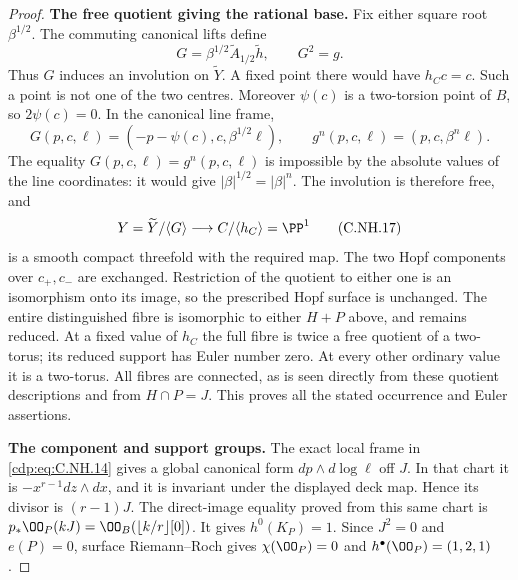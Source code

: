 \begin{proof}
\par\medskip\noindent\textbf{The free quotient giving the rational base.}
Fix either square root $\beta^{1/2}$. The commuting
canonical lifts define
\[
           G=\beta^{1/2}\widetilde A_{1/2}\widetilde h,
                    \qquad G^2=g.
                                                        \tag{C.NH.15}\label{cdp:eq:C.NH.15}
\]
Thus $G$ induces an involution on $\widetilde Y$. A fixed
point there would have $h_Cc=c$. Such a point is not one
of the two centres. Moreover $\psi(c)$ is a two-torsion
point of $B$, so $2\psi(c)=0$. In the canonical line frame,
\[
 G(p,c,\ell)=(-p-\psi(c),c,\beta^{1/2}\ell),
 \qquad g^n(p,c,\ell)=(p,c,\beta^n\ell).
                                                        \tag{C.NH.16}\label{cdp:eq:C.NH.16}
\]
The equality $G(p,c,\ell)=g^n(p,c,\ell)$ is impossible by
the absolute values of the line coordinates: it would
give $|\beta|^{1/2}=|\beta|^n$. The involution is therefore
free, and
\[
                 Y=\widetilde Y/\langle G\rangle
                  \longrightarrow C/\langle h_C\rangle=\PP^1
                                                        \tag{C.NH.17}\label{cdp:eq:C.NH.17}
\]
is a smooth compact threefold with the required map.
The two Hopf components over $c_+,c_-$ are exchanged.
Restriction of the quotient to either one is an
isomorphism onto its image, so the prescribed Hopf
surface is unchanged. The entire distinguished fibre is
isomorphic to either $H+P$ above, and remains reduced.
At a fixed value of $h_C$ the full fibre is twice a free
quotient of a two-torus; its reduced support has Euler
number zero. At every other ordinary value it is a
two-torus. All fibres are connected, as is seen directly
from these quotient descriptions and from $H\cap P=J$.
This proves all the stated occurrence and Euler assertions.

\par\medskip\noindent\textbf{The component and support groups.}
The exact local frame in \eqref{cdp:eq:C.NH.14} gives a global canonical
form $dp\wedge d\log\ell$ off $J$. In that chart it is
$-x^{r-1}dz\wedge dx$, and it is invariant under the
displayed deck map. Hence its divisor is $(r-1)J$.
The direct-image equality proved from this same chart is
$p_*\OO_P(kJ)=\OO_B(\lfloor k/r\rfloor[0])$.
It gives $h^0(K_P)=1$. Since $J^2=0$ and $e(P)=0$,
surface Riemann--Roch gives $\chi(\OO_P)=0$ and
$h^\bullet(\OO_P)=(1,2,1)$.


\end{proof}

